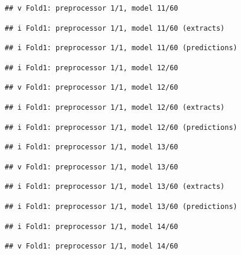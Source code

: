 \documentclass[
]{article}
\begin{document}
\begin{verbatim}
## v Fold1: preprocessor 1/1, model 11/60
\end{verbatim}

\begin{verbatim}
## i Fold1: preprocessor 1/1, model 11/60 (extracts)
\end{verbatim}

\begin{verbatim}
## i Fold1: preprocessor 1/1, model 11/60 (predictions)
\end{verbatim}

\begin{verbatim}
## i Fold1: preprocessor 1/1, model 12/60
\end{verbatim}

\begin{verbatim}
## v Fold1: preprocessor 1/1, model 12/60
\end{verbatim}

\begin{verbatim}
## i Fold1: preprocessor 1/1, model 12/60 (extracts)
\end{verbatim}

\begin{verbatim}
## i Fold1: preprocessor 1/1, model 12/60 (predictions)
\end{verbatim}

\begin{verbatim}
## i Fold1: preprocessor 1/1, model 13/60
\end{verbatim}

\begin{verbatim}
## v Fold1: preprocessor 1/1, model 13/60
\end{verbatim}

\begin{verbatim}
## i Fold1: preprocessor 1/1, model 13/60 (extracts)
\end{verbatim}

\begin{verbatim}
## i Fold1: preprocessor 1/1, model 13/60 (predictions)
\end{verbatim}

\begin{verbatim}
## i Fold1: preprocessor 1/1, model 14/60
\end{verbatim}

\begin{verbatim}
## v Fold1: preprocessor 1/1, model 14/60
\end{verbatim}
\end{document}
